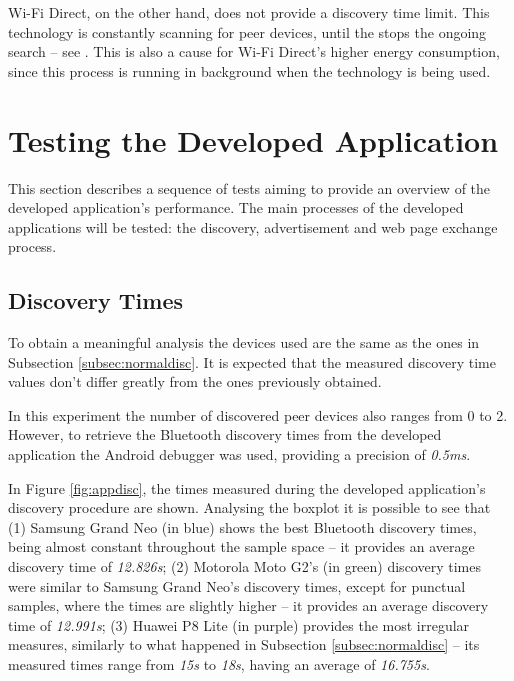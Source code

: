Wi-Fi Direct, on the other hand, does not provide a discovery time limit. This technology is constantly scanning for peer devices, until the stops the ongoing search -- see \cite{wfddisc}. This is also a cause for Wi-Fi Direct's higher energy consumption, since this process is running in background when the technology is being used.

\section{Testing the Developed Application}

This section describes a sequence of tests aiming to provide an overview of the developed application's performance. The main processes of the developed applications will be tested: the discovery, advertisement and web page exchange process.

\subsection{Discovery Times}
\label{subsec:appdisc}

To obtain a meaningful analysis the devices used are the same as the ones in Subsection \ref{subsec:normaldisc}. It is expected that the measured discovery time values don't differ greatly from the ones previously obtained.

In this experiment the number of discovered peer devices also ranges from 0 to 2. However, to retrieve the Bluetooth discovery times from the developed application the Android debugger was used, providing a precision of \textit{0.5ms}.

In Figure \ref{fig:appdisc}, the times measured during the developed application's discovery procedure are shown. Analysing the boxplot it is possible to see that (1) Samsung Grand Neo (in blue) shows the best Bluetooth discovery times, being almost constant throughout the sample space -- it provides an average discovery time of \textit{12.826s}; (2) Motorola Moto G2's (in green) discovery times were similar to Samsung Grand Neo's discovery times, except for punctual samples, where the times are slightly higher -- it provides an average discovery time of \textit{12.991s}; (3) Huawei P8 Lite (in purple) provides the most irregular measures, similarly to what happened in Subsection \ref{subsec:normaldisc} -- its measured times range from \textit{15s} to \textit{18s}, having an average of \textit{16.755s}.

